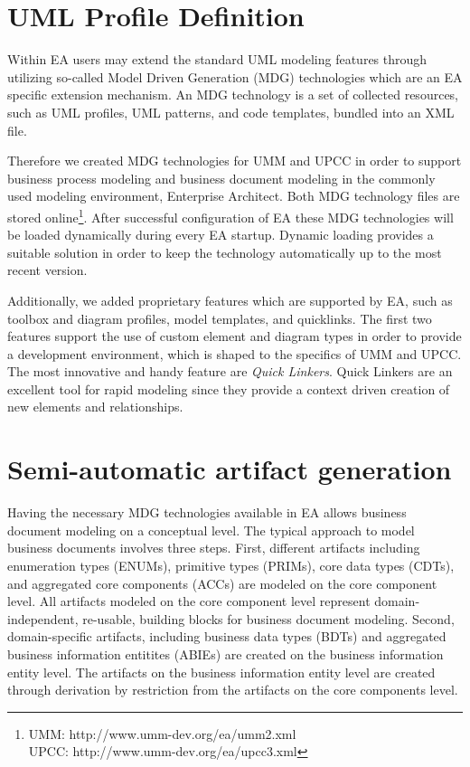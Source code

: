 \documentclass{acm_proc_article-sp}
\begin{document}
\section{UML Profile Definition}
Within EA users may extend the standard UML modeling features through utilizing so-called Model Driven Generation (MDG) technologies which are an EA specific extension mechanism. An MDG technology is a set of collected resources, such as UML profiles, UML patterns, and code templates, bundled into an XML file.

Therefore we created MDG technologies for UMM and UPCC in order to support business process modeling and business document modeling in the commonly used modeling environment, Enterprise Architect. Both MDG technology files are stored online\footnote{UMM: http://www.umm-dev.org/ea/umm2.xml\\UPCC:\; http://www.umm-dev.org/ea/upcc3.xml}. After successful configuration of EA these MDG technologies will be loaded dynamically during every EA startup. Dynamic loading provides a suitable solution in order to keep the technology automatically up to the most recent version. 

Additionally, we added proprietary features which are supported by EA, such as toolbox and diagram profiles, model templates, and quicklinks. The first two features support the use of custom element and diagram types in order to provide a development environment, which is shaped to the specifics of UMM and UPCC. The most innovative and handy feature are \textit{Quick Linkers}. Quick Linkers are an excellent tool for rapid modeling since they provide a context driven creation of new elements and relationships. 

\section{Semi-automatic artifact generation}

Having the necessary MDG technologies available in EA allows business document modeling on a conceptual level. The typical approach to model business documents involves three steps. First, different artifacts including enumeration types (ENUMs), primitive types (PRIMs), core data types (CDTs), and aggregated core components (ACCs) are modeled on the core component level. All artifacts modeled on the core component level represent domain-independent, re-usable, building blocks for business document modeling. Second, domain-specific artifacts, including business data types (BDTs) and aggregated business information entitites (ABIEs) are created on the business information entity level. The artifacts on the business information entity level are created through derivation by restriction from the artifacts on the core components level. 
\end{document}

